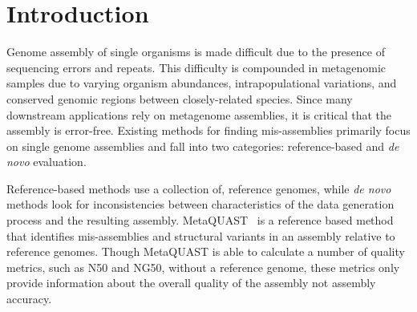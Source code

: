 \documentclass{bioinfo}
\begin{document}
\section{Introduction}

Genome assembly of single organisms is made difficult due to the presence of sequencing errors and repeats.
This difficulty is compounded in metagenomic samples due to varying organism abundances, intrapopulational variations, and conserved genomic regions between closely-related species.
Since many downstream applications rely on metagenome assemblies, it is critical that the assembly is error-free.
Existing methods for finding mis-assemblies primarily focus on single genome assemblies and fall into two categories: reference-based and \emph{de novo} evaluation.

Reference-based methods use a collection of, reference genomes, while \emph{de novo} methods look for inconsistencies between characteristics of the data generation process and the resulting assembly. 
MetaQUAST~\citep{mikheenko2015metaquast} is a reference based method that identifies mis-assemblies and structural variants in an assembly relative to reference genomes.
Though MetaQUAST is able to calculate a number of quality metrics, such as N50 and NG50, without a reference genome, these metrics only provide information about the overall quality of the assembly not assembly accuracy.
\end{document}
